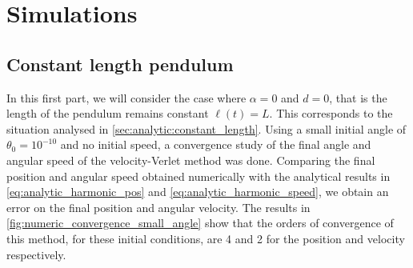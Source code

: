 \section{Simulations}

\subsection{Constant length pendulum}

In this first part, we will consider the case where \(\alpha=0\) and \(d=0\), that is the length of the pendulum remains constant \(\ell(t)=L\). This corresponds to the situation analysed in \autoref{sec:analytic:constant_length}. Using a small initial angle of \(\theta_0=10^{-10}\) and no initial speed, a convergence study of the final angle and angular speed of the velocity-Verlet method was done. Comparing the final position and angular speed obtained numerically with the analytical results in \autoref{eq:analytic_harmonic_pos} and \autoref{eq:analytic_harmonic_speed}, we obtain an error on the final position and angular velocity. The results in \autoref{fig:numeric_convergence_small_angle} show that the orders of convergence of this method, for these initial conditions, are 4 and 2 for the position and velocity respectively.

